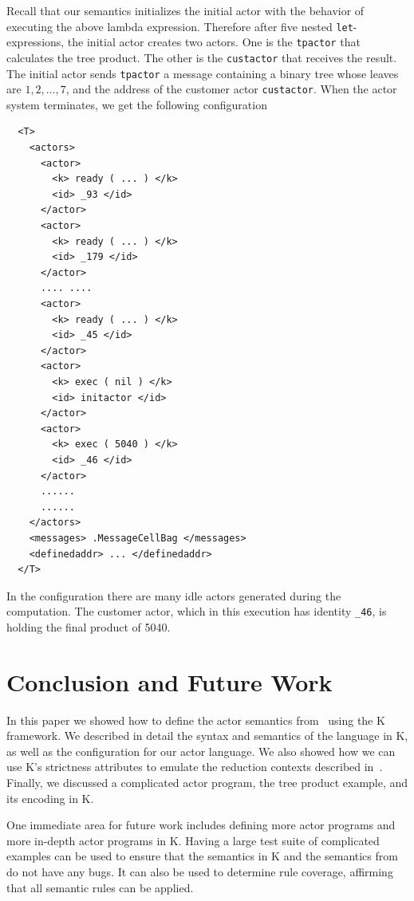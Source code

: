 \documentclass{llncs}
\begin{document}
Recall that our semantics initializes the initial actor with the behavior of 
executing the above lambda expression.
Therefore after five nested \texttt{let}-expressions, the initial actor creates 
two 
actors. One is the \texttt{tpactor} that calculates the tree product.
The other is the \texttt{custactor} that receives the result.
The initial actor sends \texttt{tpactor} a message containing a binary tree 
whose leaves are $1, 2, \dots, 7$, and the address of the customer actor 
\texttt{custactor}.
When the actor system terminates, we get the following configuration
\small
\begin{verbatim}
  <T>
    <actors>
      <actor>
        <k> ready ( ... ) </k>
        <id> _93 </id>
      </actor>
      <actor>
        <k> ready ( ... ) </k>
        <id> _179 </id>
      </actor>
      .... ....
      <actor>
        <k> ready ( ... ) </k>
        <id> _45 </id>
      </actor>
      <actor>
        <k> exec ( nil ) </k>
        <id> initactor </id>
      </actor>
      <actor>
        <k> exec ( 5040 ) </k>
        <id> _46 </id>
      </actor>
      ......
      ......
    </actors>
    <messages> .MessageCellBag </messages>
    <definedaddr> ... </definedaddr>
  </T>
\end{verbatim}
\normalsize
In the configuration there are many idle actors generated during the 
computation. The customer actor, which in this execution has identity 
\texttt{\_46}, is holding the final product of 5040.

\section{Conclusion and Future Work}
\label{sec:conclusion}
In this paper we showed how to define the actor semantics from~\cite{actor} using the
K framework. We described in detail the syntax and semantics of the language in
K, as well as the configuration for our actor language. We also showed how we
can use K's strictness attributes to emulate the reduction contexts described
in~\cite{actor}. Finally, we discussed a complicated actor program, the tree product
example, and its encoding in K.

One immediate area for future work includes defining more actor programs and
more in-depth actor programs in K. Having a large test suite of complicated
examples can be used to ensure that the semantics in K and the semantics
from~\cite{actor} do not have any bugs. It can also be used to determine rule
coverage, affirming that all semantic rules can be applied.
\end{document}
